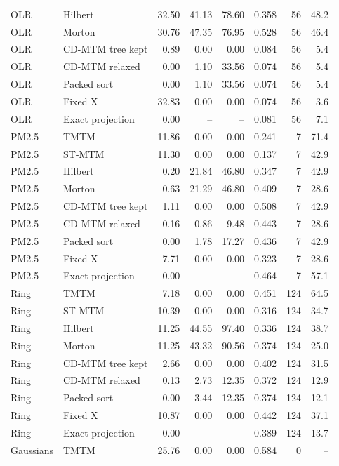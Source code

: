 \begin{longtable}{llrrrrrr}
OLR & Hilbert & 32.50 & 41.13 & 78.60 & 0.358 & 56 & 48.2\\
OLR & Morton & 30.76 & 47.35 & 76.95 & 0.528 & 56 & 46.4\\
OLR & CD-MTM tree kept & 0.89 & 0.00 & 0.00 & 0.084 & 56 & 5.4\\
OLR & CD-MTM relaxed & 0.00 & 1.10 & 33.56 & 0.074 & 56 & 5.4\\
OLR & Packed sort & 0.00 & 1.10 & 33.56 & 0.074 & 56 & 5.4\\
OLR & Fixed X & 32.83 & 0.00 & 0.00 & 0.074 & 56 & 3.6\\
OLR & Exact projection & 0.00 & -- & -- & 0.081 & 56 & 7.1\\
PM2.5 & TMTM & 11.86 & 0.00 & 0.00 & 0.241 & 7 & 71.4\\
PM2.5 & ST-MTM & 11.30 & 0.00 & 0.00 & 0.137 & 7 & 42.9\\
PM2.5 & Hilbert & 0.20 & 21.84 & 46.80 & 0.347 & 7 & 42.9\\
PM2.5 & Morton & 0.63 & 21.29 & 46.80 & 0.409 & 7 & 28.6\\
PM2.5 & CD-MTM tree kept & 1.11 & 0.00 & 0.00 & 0.508 & 7 & 42.9\\
PM2.5 & CD-MTM relaxed & 0.16 & 0.86 & 9.48 & 0.443 & 7 & 28.6\\
PM2.5 & Packed sort & 0.00 & 1.78 & 17.27 & 0.436 & 7 & 42.9\\
PM2.5 & Fixed X & 7.71 & 0.00 & 0.00 & 0.323 & 7 & 28.6\\
PM2.5 & Exact projection & 0.00 & -- & -- & 0.464 & 7 & 57.1\\
Ring & TMTM & 7.18 & 0.00 & 0.00 & 0.451 & 124 & 64.5\\
Ring & ST-MTM & 10.39 & 0.00 & 0.00 & 0.316 & 124 & 34.7\\
Ring & Hilbert & 11.25 & 44.55 & 97.40 & 0.336 & 124 & 38.7\\
Ring & Morton & 11.25 & 43.32 & 90.56 & 0.374 & 124 & 25.0\\
Ring & CD-MTM tree kept & 2.66 & 0.00 & 0.00 & 0.402 & 124 & 31.5\\
Ring & CD-MTM relaxed & 0.13 & 2.73 & 12.35 & 0.372 & 124 & 12.9\\
Ring & Packed sort & 0.00 & 3.44 & 12.35 & 0.374 & 124 & 12.1\\
Ring & Fixed X & 10.87 & 0.00 & 0.00 & 0.442 & 124 & 37.1\\
Ring & Exact projection & 0.00 & -- & -- & 0.389 & 124 & 13.7\\
Gaussians & TMTM & 25.76 & 0.00 & 0.00 & 0.584 & 0 & --\\

\end{longtable}
